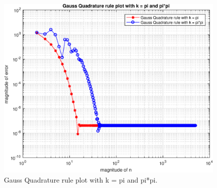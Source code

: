 \documentclass[titlepage]{article}
\begin{document}
\begin{figure}[htb]
\begin{center}
\includegraphics[width=1.0\textwidth]{Gauss.eps}
\caption{Gauss Quadrature rule plot with k = pi and pi*pi. \label{fig:2}}
\end{center}
\end{figure} 
\end{document}
